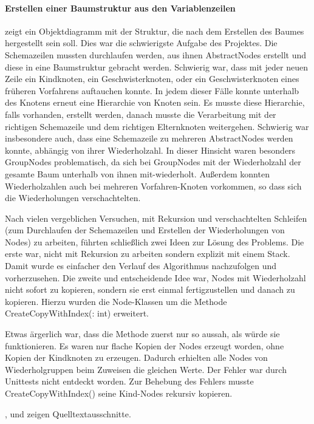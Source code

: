 \paragraph{Erstellen einer Baumstruktur aus den Variablenzeilen}
 zeigt ein Objektdiagramm mit der Struktur, die nach dem Erstellen des Baumes hergestellt sein soll.
Dies war die schwierigste Aufgabe des Projektes. Die Schemazeilen mussten durchlaufen werden, aus ihnen AbstractNodes erstellt und diese in eine Baumstruktur gebracht werden.
Schwierig war, dass mit jeder neuen  Zeile ein Kindknoten, ein Geschwisterknoten, oder ein Geschwisterknoten eines früheren Vorfahrens auftauchen konnte. In jedem dieser Fälle konnte unterhalb des Knotens erneut eine Hierarchie von Knoten sein. Es musste diese Hierarchie, falls vorhanden, erstellt werden, danach musste die Verarbeitung mit der richtigen Schemazeile und dem richtigen Elternknoten weitergehen.
Schwierig war insbesondere auch, dass eine Schemazeile zu mehreren AbstractNodes werden konnte, abhängig von ihrer Wiederholzahl. In dieser Hinsicht waren besonders GroupNodes problematisch, da sich bei GroupNodes mit der Wiederholzahl der gesamte Baum unterhalb von ihnen mit-wiederholt. Außerdem konnten Wiederholzahlen auch bei mehreren Vorfahren-Knoten vorkommen, so dass sich die Wiederholungen verschachtelten.

Nach vielen vergeblichen Versuchen, mit Rekursion und verschachtelten Schleifen (zum Durchlaufen der Schemazeilen und Erstellen der Wiederholungen von Nodes) zu arbeiten, führten schließlich zwei Ideen zur Lösung des Problems. Die erste war, nicht mit Rekursion zu arbeiten sondern explizit mit einem Stack. Damit wurde es einfacher den Verlauf des Algorithmus  nachzufolgen und vorherzusehen. Die zweite und entscheidende Idee war, Nodes mit Wiederholzahl nicht sofort zu kopieren, sondern sie erst einmal fertigzustellen und danach zu kopieren. Hierzu wurden die Node-Klassen um die Methode CreateCopyWithIndex(: int) erweitert.

Etwas ärgerlich war, dass die Methode zuerst nur so aussah, als würde sie funktionieren. Es waren nur flache Kopien der Nodes erzeugt worden, ohne Kopien der Kindknoten zu erzeugen. Dadurch erhielten alle Nodes von Wiederholgruppen beim Zuweisen die gleichen Werte. Der Fehler war durch Unittests nicht entdeckt worden. Zur Behebung des Fehlers musste CreateCopyWithIndex() seine Kind-Nodes rekursiv kopieren.


,  und  zeigen Quelltextausschnitte.


